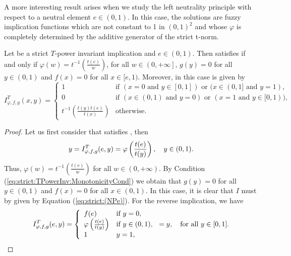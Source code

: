 A more interesting result arises when we study the left neutrality principle with respect to a neutral element $e \in (0,1)$. In this case, the solutions are fuzzy implication functions which are not constant to 1 in $(0,1)^2$ and whose $\varphi$ is completely determined by the additive generator of the strict t-norm.
\begin{proposition}\label{prop:strict:(NPe)}
	Let \IT be a strict $T$-power invariant implication and $e \in (0,1)$. Then \IT satisfies \NPe if and only if 
	$\varphi(w) = t^{-1} \left(\frac{t(e)}{w}\right)$, for all $w \in \left(0,+\infty\right]$, $g(y)=0$ for all $y \in (0,1)$ and $f(x)=0$ for all $x \in [e,1)$. Moreover, in this case \IT is given by
	\begin{equation}\label{eq:strict:(NPe)}
		I^T_{\varphi,f,g}(x,y) =\left\{ \begin{array}{ll}
			1 & \text{if } (x=0 \text{ and } y \in [0,1]) \text{ or } (x \in (0,1] \text{ and } y=1),\\
			0 &   \text{if }   (x \in (0,1) \text{ and } y=0) \text{ or } ( x = 1 \text{ and } y\in [0,1)), \\
			t^{-1}\left(\frac{t(y)t(e)}{t(x)}\right) &  \text{otherwise}.
		\end{array}
		\right.
	\end{equation}
\end{proposition}
\begin{proof}
	Let us first consider that \IT satisfies \NPe, then
	$$y = I^T_{\varphi,f,g}(e,y)=\varphi \left(\frac{t(e)}{t(y)}\right), \quad y \in (0,1).$$
	Thus, $\varphi(w)=t^{-1}\left(\frac{t(e)}{w}\right)$ for all $w \in \left(0,+\infty\right)$. By Condition (\ref{eq:strict:TPowerInv:MonotonicityCond}) we obtain that $g(y)=0$ for all $y \in (0,1)$ and $f(x)=0$ for all $x \in (0,1)$. In this case, it is clear that $I$ must by given by Equation (\ref{eq:strict:(NPe)}). For the reverse implication, we have
	$$I^T_{\varphi,f,g}(e,y)
	=
	\left\{ \begin{array}{ll}
		f(e) &   \text{if }   y=0, \\
		\varphi \left(\frac{t(e)}{t(y)}\right) &  \text{if }  y \in (0,1), \\
		1 & y=1,
	\end{array}
	\right.
	=y, \quad \text{for all } y \in [0,1].
	$$
\end{proof}

